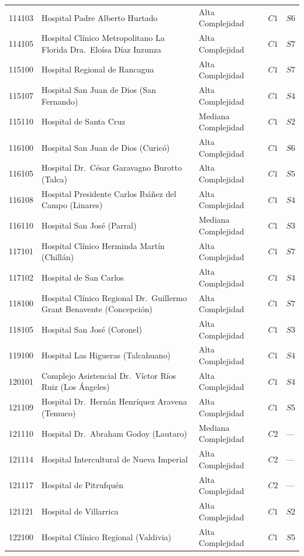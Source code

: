 \begin{longtable}{p{1.3cm} p{6.8cm} p{2.4cm} p{1.0cm} p{1.0cm}}
114103 & Hospital Padre Alberto Hurtado & Alta Complejidad & $C1$ & $S6$ \\
114105 & Hospital Clínico Metropolitano La Florida Dra.\ Eloísa Díaz Inzunza & Alta Complejidad & $C1$ & $S7$ \\
115100 & Hospital Regional de Rancagua & Alta Complejidad & $C1$ & $S7$ \\
115107 & Hospital San Juan de Dios (San Fernando) & Alta Complejidad & $C1$ & $S4$ \\
115110 & Hospital de Santa Cruz & Mediana Complejidad & $C1$ & $S2$ \\
116100 & Hospital San Juan de Dios (Curicó) & Alta Complejidad & $C1$ & $S6$ \\
116105 & Hospital Dr.\ César Garavagno Burotto (Talca) & Alta Complejidad & $C1$ & $S5$ \\
116108 & Hospital Presidente Carlos Ibáñez del Campo (Linares) & Alta Complejidad & $C1$ & $S4$ \\
116110 & Hospital San José (Parral) & Mediana Complejidad & $C1$ & $S3$ \\
117101 & Hospital Clínico Herminda Martín (Chillán) & Alta Complejidad & $C1$ & $S7$ \\
117102 & Hospital de San Carlos & Alta Complejidad & $C1$ & $S4$ \\
118100 & Hospital Clínico Regional Dr.\ Guillermo Grant Benavente (Concepción) & Alta Complejidad & $C1$ & $S7$ \\
118105 & Hospital San José (Coronel) & Alta Complejidad & $C1$ & $S3$ \\
119100 & Hospital Las Higueras (Talcahuano) & Alta Complejidad & $C1$ & $S4$ \\
120101 & Complejo Asistencial Dr.\ Víctor Ríos Ruiz (Los Ángeles) & Alta Complejidad & $C1$ & $S4$ \\
121109 & Hospital Dr.\ Hernán Henríquez Aravena (Temuco) & Alta Complejidad & $C1$ & $S5$ \\
121110 & Hospital Dr.\ Abraham Godoy (Lautaro) & Mediana Complejidad & $C2$ & --- \\
121114 & Hospital Intercultural de Nueva Imperial & Alta Complejidad & $C2$ & --- \\
121117 & Hospital de Pitrufquén & Alta Complejidad & $C2$ & --- \\
121121 & Hospital de Villarrica & Alta Complejidad & $C1$ & $S2$ \\
122100 & Hospital Clínico Regional (Valdivia) & Alta Complejidad & $C1$ & $S5$ \\

\end{longtable}
